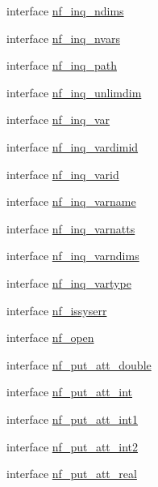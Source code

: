 \begin{DoxyCompactItemize}
\item 
interface \hyperlink{interfacenetcdf__nf__interfaces_1_1nf__inq__ndims}{nf\+\_\+inq\+\_\+ndims}
\item 
interface \hyperlink{interfacenetcdf__nf__interfaces_1_1nf__inq__nvars}{nf\+\_\+inq\+\_\+nvars}
\item 
interface \hyperlink{interfacenetcdf__nf__interfaces_1_1nf__inq__path}{nf\+\_\+inq\+\_\+path}
\item 
interface \hyperlink{interfacenetcdf__nf__interfaces_1_1nf__inq__unlimdim}{nf\+\_\+inq\+\_\+unlimdim}
\item 
interface \hyperlink{interfacenetcdf__nf__interfaces_1_1nf__inq__var}{nf\+\_\+inq\+\_\+var}
\item 
interface \hyperlink{interfacenetcdf__nf__interfaces_1_1nf__inq__vardimid}{nf\+\_\+inq\+\_\+vardimid}
\item 
interface \hyperlink{interfacenetcdf__nf__interfaces_1_1nf__inq__varid}{nf\+\_\+inq\+\_\+varid}
\item 
interface \hyperlink{interfacenetcdf__nf__interfaces_1_1nf__inq__varname}{nf\+\_\+inq\+\_\+varname}
\item 
interface \hyperlink{interfacenetcdf__nf__interfaces_1_1nf__inq__varnatts}{nf\+\_\+inq\+\_\+varnatts}
\item 
interface \hyperlink{interfacenetcdf__nf__interfaces_1_1nf__inq__varndims}{nf\+\_\+inq\+\_\+varndims}
\item 
interface \hyperlink{interfacenetcdf__nf__interfaces_1_1nf__inq__vartype}{nf\+\_\+inq\+\_\+vartype}
\item 
interface \hyperlink{interfacenetcdf__nf__interfaces_1_1nf__issyserr}{nf\+\_\+issyserr}
\item 
interface \hyperlink{interfacenetcdf__nf__interfaces_1_1nf__open}{nf\+\_\+open}
\item 
interface \hyperlink{interfacenetcdf__nf__interfaces_1_1nf__put__att__double}{nf\+\_\+put\+\_\+att\+\_\+double}
\item 
interface \hyperlink{interfacenetcdf__nf__interfaces_1_1nf__put__att__int}{nf\+\_\+put\+\_\+att\+\_\+int}
\item 
interface \hyperlink{interfacenetcdf__nf__interfaces_1_1nf__put__att__int1}{nf\+\_\+put\+\_\+att\+\_\+int1}
\item 
interface \hyperlink{interfacenetcdf__nf__interfaces_1_1nf__put__att__int2}{nf\+\_\+put\+\_\+att\+\_\+int2}
\item 
interface \hyperlink{interfacenetcdf__nf__interfaces_1_1nf__put__att__real}{nf\+\_\+put\+\_\+att\+\_\+real}

\end{DoxyCompactItemize}
